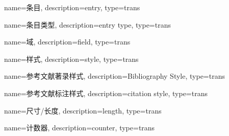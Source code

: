 {
name={条目},
description={entry},
type={trans}
}

{
name={条目类型},
description={entry type},
type={trans}
}

{
name={域},
description={field},
type={trans}
}

{
name={样式},
description={style},
type={trans}
}

{
name={参考文献著录样式},
description={Bibliography Style},
type={trans}
}

{
name={参考文献标注样式},
description={citation style},
type={trans}
}

{
name={尺寸/长度},
description={length},
type={trans}
}

{
name={计数器},
description={counter},
type={trans}
}

